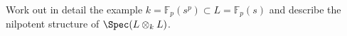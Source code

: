 \begin{problem}\label{chall:vi24-03}
Work out in detail the example $k=\mathbb F_p(s^p)\subset L=\mathbb F_p(s)$ and describe the nilpotent structure of $\Spec(L\otimes_kL)$.
\end{problem}
